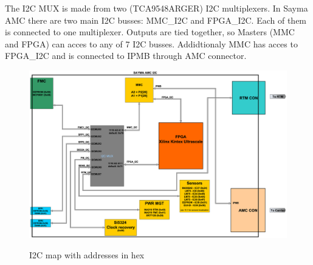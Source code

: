 	
\clearpage


The I2C MUX is made from two (TCA9548ARGER)  I2C multiplexers. In Sayma AMC there are two main I2C busses: MMC\_I2C and FPGA\_I2C. Each of them is connected to one multiplexer. Outputs are tied together, so Masters (MMC and FPGA) can acces to any of 7 I2C busses. Addidtionaly MMC has acces to FPGA\_I2C and is connected to IPMB through AMC connector.\\  
	\begin{figure}[htbp!]
		\centering
		\includegraphics[scale=0.2]{img/i2c.eps}\\
		\caption{I2C map with addresses in hex} \label{I2C}
	\end{figure}

